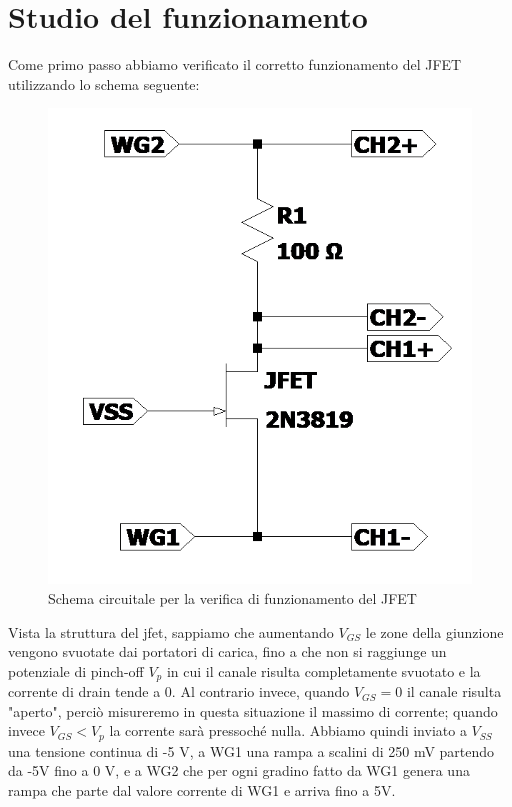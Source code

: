 \documentclass[10pt, a4paper, italian]{article}
\begin{document}
\section{Studio del funzionamento}
Come primo passo abbiamo verificato il corretto funzionamento del JFET utilizzando lo schema seguente:
\begin{figure}[H]
    \centering
	\includegraphics[scale=0.5]{Draft1}
    \caption{Schema circuitale per la verifica di funzionamento del JFET}
\end{figure}
Vista la struttura del jfet, sappiamo che aumentando $V_{GS}$ le zone della giunzione vengono svuotate dai portatori di carica, fino a che non si raggiunge un potenziale di pinch-off $V_p$ in cui il canale risulta completamente svuotato e la corrente di drain tende a 0. Al contrario invece, quando $V_{GS}=0$ il canale risulta "aperto", perciò misureremo in questa situazione il massimo di corrente; quando invece $V_{GS}<V_p$ la corrente sarà pressoché nulla.
Abbiamo quindi inviato a $V_{SS}$ una tensione continua di -5 V, a WG1 una rampa a scalini di 250 mV partendo da -5V fino a 0 V, e a WG2 che per ogni gradino fatto da WG1 genera una rampa che parte dal valore corrente di WG1 e arriva fino a 5V.
\end{document}
